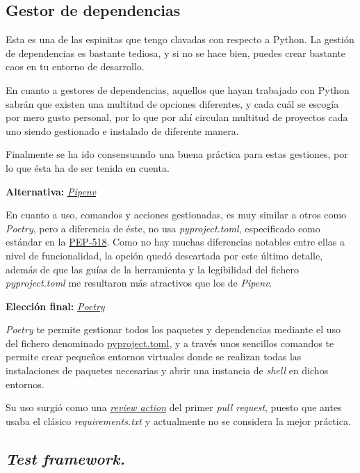 \subsection{Gestor de dependencias}

Esta es una de las espinitas que tengo clavadas con respecto a Python. La gestión de dependencias es bastante tediosa, y si no se hace bien, puedes crear bastante caos en tu entorno de desarrollo.

En cuanto a gestores de dependencias, aquellos que hayan trabajado con Python sabrán que existen una multitud de opciones diferentes, y cada cuál se escogía por mero gusto personal, por lo que por ahí circulan multitud de proyectos cada uno siendo gestionado e instalado de diferente manera.

Finalmente se ha ido consensuando una buena práctica para estas gestiones, por lo que ésta ha de ser tenida en cuenta.

\textbf{Alternativa:} \href{https://pipenv-es.readthedocs.io/es/latest/}{\textit{Pipenv}}

En cuanto a uso, comandos y acciones gestionadas, es muy similar a otros como \textit{Poetry}, pero a diferencia de éste, no usa \textit{pyproject.toml}, especificado como estándar en la \href{https://peps.python.org/pep-0518/}{PEP-518}. Como no hay muchas diferencias notables entre ellas a nivel de funcionalidad, la opción quedó descartada por este último detalle, además de que las guías de la herramienta y la legibilidad del fichero \textit{pyproject.toml} me resultaron más atractivos que los de \textit{Pipenv}.

\textbf{Elección final:} \href{https://python-poetry.org/}{\textit{Poetry}}

\textit{Poetry} te permite gestionar todos los paquetes y dependencias mediante el uso del fichero denominado \href{https://github.com/Anglepi/My-Many-Reads/blob/main/pyproject.toml}{pyproject.toml}, y a través unos sencillos comandos te permite crear pequeños entornos virtuales donde se realizan todas las instalaciones de paquetes necesarias y abrir una instancia de \textit{shell} en dichos entornos.

Su uso surgió como una \href{https://github.com/Anglepi/My-Many-Reads/pull/39#discussion_r974230463}{\textit{review action}} del primer \textit{pull request}, puesto que antes usaba el clásico \textit{requirements.txt} y actualmente no se considera la mejor práctica.

\subsection{\textit{Test framework.}}

